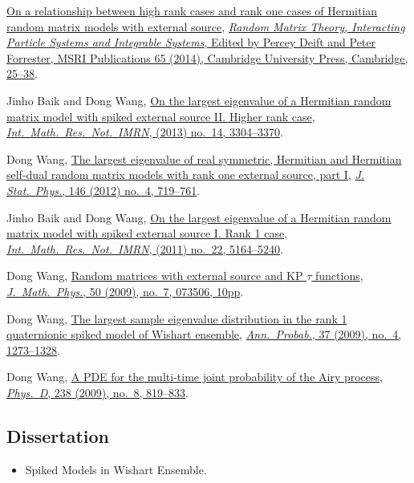 \documentclass[12pt,a4paper]{article}
\begin{document}
\begin{etaremune}
  \href{http://arxiv.org/abs/1207.0389}{On a relationship between high rank cases and rank one cases of Hermitian random matrix models with external source}, \href{http://www.cambridge.org/asia/catalogue/catalogue.asp?isbn=9781107079922}{\textit{Random Matrix Theory, Interacting Particle Systems and Integrable Systems}, Edited by Percey Deift and Peter Forrester, MSRI Publications 65 (2014), Cambridge University Press, Cambridge, 25--38}.
\item Jinho Baik and Dong Wang,
  \href{http://arxiv.org/abs/1104.2915}{On the largest eigenvalue of a Hermitian random matrix model with spiked external source II. Higher rank case}, \href{https://doi.org/10.1093/imrn/rns136}{\textit{Int.\ Math.\ Res.\ Not.\ IMRN}, (2013) no.\ 14, 3304--3370}.
\item Dong Wang,
  \href{http://arxiv.org/abs/1012.4144}{The largest eigenvalue of real symmetric, Hermitian and Hermitian self-dual random matrix models with rank one external source, part I}, \href{https://doi.org/10.1007/s10955-012-0417-x}{\textit{J. Stat.\ Phys.}, 146 (2012) no.\ 4, 719--761}.
\item Jinho Baik and  Dong Wang,
  \href{http://arxiv.org/abs/1010.4604}{On the largest eigenvalue of a Hermitian random matrix model with spiked external source I. Rank 1 case}, \href{https://doi.org/10.1093/imrn/rnq257}{\textit{Int.\ Math.\ Res.\ Not.\ IMRN}, (2011) no.\ 22, 5164--5240}.
\item Dong Wang,
  \href{http://arxiv.org/abs/0810.0280}{Random matrices with external source and KP $\tau$ functions}, \href{https://doi.org/10.1063/1.3167802}{\textit{J.\ Math.\ Phys.}, 50 (2009), no.\ 7, 073506, 10pp}.
\item Dong Wang,
 \href{http://arxiv.org/abs/0711.2722}{The largest sample eigenvalue distribution in the rank 1 quaternionic spiked model of Wishart ensemble}, \href{https://doi.org/10.1214/08-AOP432}{\textit{Ann.\ Probab.}, 37 (2009), no.\ 4, 1273--1328}.
\item Dong Wang,
  \href{http://arxiv.org/abs/0711.3797}{A PDE for the multi-time joint probability of the Airy process}, \href{https://doi.org/10.1016/j.physd.2009.02.007}{\textit{Phys.\ D}, 238 (2009), no.\ 8, 819--833}.
\end{etaremune}

\subsection*{Dissertation}
\begin{itemize}
\item
  Spiked Models in Wishart Ensemble.
\end{itemize}
\end{document}
